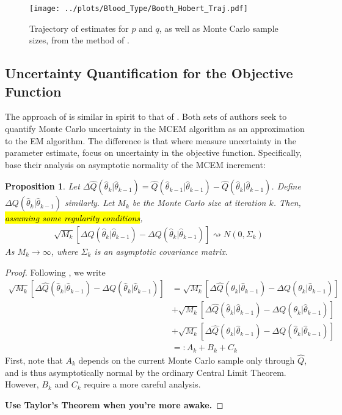 \documentclass[11pt, oneside]{article}   	%
\newtheorem{proposition}{Proposition}[section]
\begin{document}
\begin{figure}
    \centering
    \caption{Trajectory of estimates for $p$ and $q$, as well as Monte Carlo sample sizes, from the method of \citeauthor{Boo99}.}
    \label{fig:blood_BH_traj}
    \texttt{[image: ../plots/Blood\_Type/Booth\_Hobert\_Traj.pdf]}   
\end{figure}




\subsection{Uncertainty Quantification for the Objective Function \citep{Caf05}}

The approach of \citet{Caf05} is similar in spirit to that of \citet{Boo99}. Both sets of authors seek to quantify Monte Carlo uncertainty in the MCEM algorithm as an approximation to the EM algorithm. The difference is that where \citeauthor{Boo99} measure uncertainty in the parameter estimate, \citeauthor{Caf05} focus on uncertainty in the objective function. Specifically, \citeauthor{Caf05} base their analysis on asymptotic normality of the MCEM increment:
%
\begin{proposition}
    \label{thm:Caf_normality}
    Let $\Delta \hat{Q}(\hat{\theta}_k|\hat{\theta}_{k-1}) = \hat{Q}(\hat{\theta}_{k-1}|\hat{\theta}_{k-1}) - \hat{Q}(\hat{\theta}_k|\hat{\theta}_{k-1})$. Define $\Delta Q(\hat{\theta}_k|\hat{\theta}_{k-1})$ similarly. Let $M_k$ be the Monte Carlo size at iteration $k$. Then, \hl{assuming some regularity conditions},
    \begin{align}
        \sqrt{M_k} \left[ \Delta \hat{Q}(\hat{\theta}_k|\hat{\theta}_{k-1}) - \Delta Q(\hat{\theta}_k|\hat{\theta}_{k-1}) \right] \rightsquigarrow N(0, \Sigma_k)
    \end{align}
    As $M_k \rightarrow \infty$, where $\Sigma_k$ is an asymptotic covariance matrix.
\end{proposition}

\begin{proof}
    Following \citet{Caf05}, we write
    \begin{align}
        \sqrt{M_k} \left[ \Delta \hat{Q}(\hat{\theta}_k|\hat{\theta}_{k-1}) - \Delta Q(\hat{\theta}_k|\hat{\theta}_{k-1}) \right] &= \sqrt{M_k} \left[ \Delta \hat{Q}(\theta_k|\hat{\theta}_{k-1}) - \Delta Q(\theta_k|\hat{\theta}_{k-1}) \right] \nonumber \\
        & + \sqrt{M_k} \left[ \Delta \hat{Q}(\hat{\theta}_k|\hat{\theta}_{k-1}) - \Delta Q(\theta_k|\hat{\theta}_{k-1}) \right]\\
        & + \sqrt{M_k} \left[ \Delta \hat{Q}(\theta_k|\hat{\theta}_{k-1}) - \Delta Q(\hat{\theta}_k|\hat{\theta}_{k-1}) \right]\\
        &=: A_k + B_k + C_k
    \end{align}
    First, note that $A_k$ depends on the current Monte Carlo sample only through $\hat{Q}$, and is thus asymptotically normal by the ordinary Central Limit Theorem. However, $B_k$ and $C_k$ require a more careful analysis.

    \textbf{Use Taylor's Theorem when you're more awake.}
\end{proof}
\end{document}
